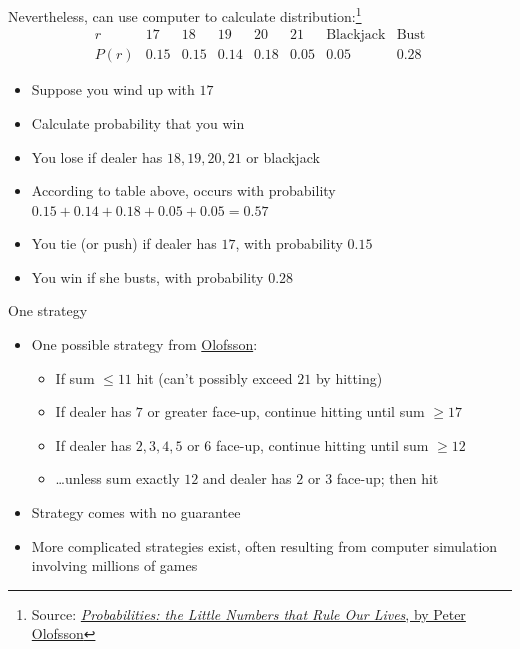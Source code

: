 \documentclass[handout]{beamer}
\theoremstyle{definition}
\begin{document}
\begin{frame}
Nevertheless, can use computer to calculate
distribution:\footnote{Source:
\href{http://www.wiley.com/WileyCDA/WileyTitle/productCd-0470624450.html}
{\color{blue}
{\em Probabilities: the Little Numbers that Rule Our Lives},
by Peter Olofsson}}
\[\begin{array}{r|lllllll}
r&17&18&19&20&21&\text{Blackjack}&\text{Bust}\\\hline
P\left(r\right)&0.15&0.15&0.14&0.18&0.05&0.05&0.28
\end{array}\]
\begin{example}
\begin{itemize}
\item Suppose you wind up with $17$
\item Calculate probability that you win
\item You lose if dealer has $18,19,20,21$ or blackjack
\item According to table above,
occurs with probability $0.15+0.14+0.18+0.05+0.05=0.57$
\item You tie (or \alert{push})
if dealer has $17$, with probability $0.15$
\item You win if she busts, with probability $0.28$
\end{itemize}
\end{example}
\end{frame}

\begin{frame}{One strategy}
\begin{itemize}
\item One possible strategy from
\href{http://www.wiley.com/WileyCDA/WileyTitle/productCd-0470624450.html}
{\color{blue}Olofsson}:
\begin{itemize}
\item If sum $\le 11$ hit (can't possibly exceed $21$ by hitting)
\item If dealer has $7$ or greater face-up, continue hitting until
sum $\ge 17$
\item If dealer has $2,3,4,5$ or $6$ face-up, continue hitting
until sum $\ge 12$
\item \dots unless sum exactly $12$ and dealer has $2$ or $3$
face-up; then hit
\end{itemize}
\item Strategy comes with no guarantee
\item More complicated strategies exist, often resulting
from computer simulation involving millions of games
\end{itemize}
\end{frame}
\end{document}
